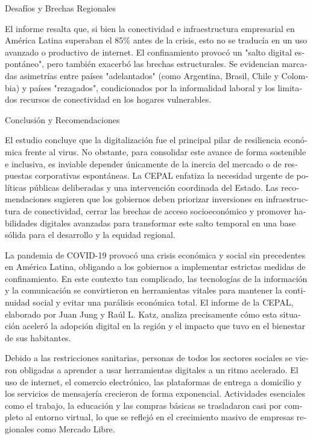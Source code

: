 \documentclass{article}
\begin{document}
\begin{tcolorbox}[colback=brown!8!white,colframe=brown!8!white,boxrule=0pt,arc=2pt,left=4pt,right=4pt,top=3pt,bottom=3pt,before skip=4pt,after skip=4pt]
\begin{otherlanguage}{spanish}
Desafíos y Brechas Regionales

El informe resalta que, si bien la conectividad e infraestructura empresarial en América Latina superaban el 85\% antes de la crisis, esto no se traducía en un uso avanzado o productivo de internet. El confinamiento provocó un "salto digital espontáneo", pero también exacerbó las brechas estructurales. Se evidencian marcadas asimetrías entre países "adelantados" (como Argentina, Brasil, Chile y Colombia) y países "rezagados", condicionados por la informalidad laboral y los limitados recursos de conectividad en los hogares vulnerables.

Conclusión y Recomendaciones

El estudio concluye que la digitalización fue el principal pilar de resiliencia económica frente al virus. No obstante, para consolidar este avance de forma sostenible e inclusiva, es inviable depender únicamente de la inercia del mercado o de respuestas corporativas espontáneas. La CEPAL enfatiza la necesidad urgente de políticas públicas deliberadas y una intervención coordinada del Estado. Las recomendaciones sugieren que los gobiernos deben priorizar inversiones en infraestructura de conectividad, cerrar las brechas de acceso socioeconómico y promover habilidades digitales avanzadas para transformar este salto temporal en una base sólida para el desarrollo y la equidad regional.

La pandemia de COVID-19 provocó una crisis económica y social sin precedentes en América Latina, obligando a los gobiernos a implementar estrictas medidas de confinamiento. En este contexto tan complicado, las tecnologías de la información y la comunicación se convirtieron en herramientas vitales para mantener la continuidad social y evitar una parálisis económica total. El informe de la CEPAL, elaborado por Juan Jung y Raúl L. Katz, analiza precisamente cómo esta situación aceleró la adopción digital en la región y el impacto que tuvo en el bienestar de sus habitantes.

Debido a las restricciones sanitarias, personas de todos los sectores sociales se vieron obligadas a aprender a usar herramientas digitales a un ritmo acelerado. El uso de internet, el comercio electrónico, las plataformas de entrega a domicilio y los servicios de mensajería crecieron de forma exponencial. Actividades esenciales como el trabajo, la educación y las compras básicas se trasladaron casi por completo al entorno virtual, lo que se reflejó en el crecimiento masivo de empresas regionales como Mercado Libre.


\end{otherlanguage}
\end{tcolorbox}
\end{document}

